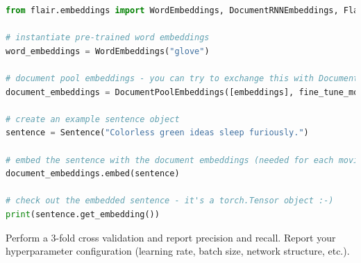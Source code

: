 \begin{enumerate}[label=\alph*)]

\pagebreak
\begin{lstlisting}[language=Python, breaklines=true, caption=Embedding documents using flair]
from flair.embeddings import WordEmbeddings, DocumentRNNEmbeddings, FlairEmbeddings, DocumentPoolEmbeddings, Sentence

# instantiate pre-trained word embeddings
word_embeddings = WordEmbeddings("glove")

# document pool embeddings - you can try to exchange this with DocumentRNNEmbeddings!
document_embeddings = DocumentPoolEmbeddings([embeddings], fine_tune_mode='none')

# create an example sentence object
sentence = Sentence("Colorless green ideas sleep furiously.")

# embed the sentence with the document embeddings (needed for each movie review)
document_embeddings.embed(sentence)

# check out the embedded sentence - it's a torch.Tensor object :-)
print(sentence.get_embedding())
\end{lstlisting}
Perform a 3-fold cross validation and report precision and recall. Report your hyperparameter configuration (learning rate, batch size, network structure, etc.).




\end{enumerate}

